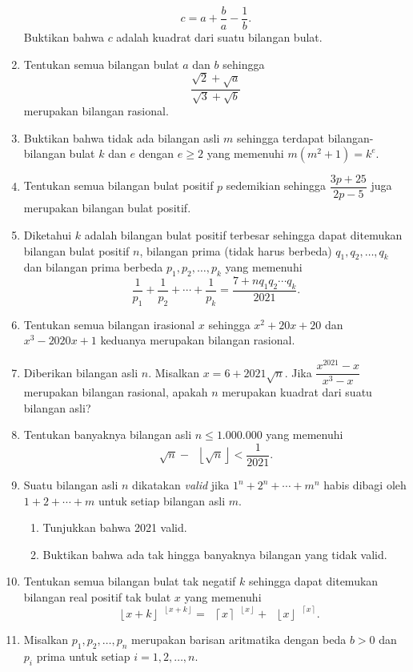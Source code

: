 \documentclass[12pt]{article}
\newcommand*\floor[1]{\mathop{}\!\left\lfloor{#1}\right\rfloor}
\newcommand*\ceil[1]{\mathop{}\!\left\lceil{#1}\right\rceil}
\begin{document}
\begin{enumerate}[leftmargin=*]
		\[ c = a + \frac{b}{a} - \frac{1}{b}. \]
		Buktikan bahwa $ c $ adalah kuadrat dari suatu bilangan bulat.
		\item Tentukan semua bilangan bulat $ a $ dan $ b $ sehingga
		\[ \frac{\sqrt{2} + \sqrt{a}}{\sqrt{3} + \sqrt{b}} \]
		merupakan bilangan rasional.
		\item Buktikan bahwa tidak ada bilangan asli $ m $ sehingga terdapat bilangan-bilangan bulat $ k $ dan $ e $ dengan $ e \geq 2 $ yang memenuhi $ m\left(m^{2} + 1\right) = k^{e} $.
		\item Tentukan semua bilangan bulat positif $ p $ sedemikian sehingga $ \dfrac{3p + 25}{2p - 5} $ juga merupakan bilangan bulat positif.
		\item Diketahui $ k $ adalah bilangan bulat positif terbesar sehingga dapat ditemukan bilangan bulat positif $ n $, bilangan prima (tidak harus berbeda) $ q_{1}, q_{2}, \dots, q_{k} $ dan bilangan prima berbeda $ p_{1}, p_{2}, \dots, p_{k} $ yang memenuhi
		\[ \frac{1}{p_{1}} + \frac{1}{p_{2}} + \cdots + \frac{1}{p_{k}} = \frac{7 + nq_{1}q_{2} \cdots q_{k}}{2021}. \]
		\item Tentukan semua bilangan irasional $ x $ sehingga $ x^{2} + 20x + 20 $ dan $ x^{3} - 2020x + 1 $ keduanya merupakan bilangan rasional.
		\item Diberikan bilangan asli $ n $. Misalkan $ x = 6 + 2021\sqrt{n} $. Jika $ \dfrac{x^{2021} - x}{x^{3} - x} $ merupakan bilangan rasional, apakah $ n $ merupakan kuadrat dari suatu bilangan asli?
		\item Tentukan banyaknya bilangan asli $ n \leq 1.000.000 $ yang memenuhi
		\[ \sqrt{n} - \floor{\sqrt{n}} < \frac{1}{2021}. \]
		\item Suatu bilangan asli $ n $ dikatakan \textit{valid} jika $ 1^{n} + 2^{n} + \cdots + m^{n} $ habis dibagi oleh $ 1 + 2 + \cdots + m $ untuk setiap bilangan asli $ m $.
		\begin{enumerate}
			\item Tunjukkan bahwa 2021 valid.
			\item Buktikan bahwa ada tak hingga banyaknya bilangan yang tidak valid.
		\end{enumerate}
		\item Tentukan semua bilangan bulat tak negatif $ k $ sehingga dapat ditemukan bilangan real positif tak bulat $ x $ yang memenuhi
		\[ \floor{x + k}^{\floor{x + k}} = \ceil{x}^{\floor{x}} + \floor{x}^{\ceil{x}}. \]
		\item Misalkan $ p_{1}, p_{2}, \dots, p_{n} $ merupakan barisan aritmatika dengan beda $ b > 0 $ dan $ p_{i} $ prima untuk setiap $ i = 1, 2, \dots, n $.

\end{enumerate}
\end{document}
